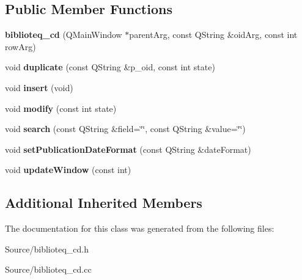 \subsection*{Public Member Functions}
\begin{DoxyCompactItemize}
\item 
{\bfseries biblioteq\+\_\+cd} (Q\+Main\+Window $\ast$parent\+Arg, const Q\+String \&oid\+Arg, const int row\+Arg)\hypertarget{classbiblioteq__cd_a060f54400243040c2374960a4f27bf40}{}\label{classbiblioteq__cd_a060f54400243040c2374960a4f27bf40}

\item 
void {\bfseries duplicate} (const Q\+String \&p\+\_\+oid, const int state)\hypertarget{classbiblioteq__cd_ae240accaf0c6d7d07effc54402b45f40}{}\label{classbiblioteq__cd_ae240accaf0c6d7d07effc54402b45f40}

\item 
void {\bfseries insert} (void)\hypertarget{classbiblioteq__cd_a29cb088f999555ed2d63b323b717b68f}{}\label{classbiblioteq__cd_a29cb088f999555ed2d63b323b717b68f}

\item 
void {\bfseries modify} (const int state)\hypertarget{classbiblioteq__cd_a0e2a26b8108bee92eb780a218fab7e7c}{}\label{classbiblioteq__cd_a0e2a26b8108bee92eb780a218fab7e7c}

\item 
void {\bfseries search} (const Q\+String \&field=\char`\"{}\char`\"{}, const Q\+String \&value=\char`\"{}\char`\"{})\hypertarget{classbiblioteq__cd_a0071b1a6d28b89c29b6ef94a9c701ae9}{}\label{classbiblioteq__cd_a0071b1a6d28b89c29b6ef94a9c701ae9}

\item 
void {\bfseries set\+Publication\+Date\+Format} (const Q\+String \&date\+Format)\hypertarget{classbiblioteq__cd_a080477c718d7c3fe6fdafc6915484df1}{}\label{classbiblioteq__cd_a080477c718d7c3fe6fdafc6915484df1}

\item 
void {\bfseries update\+Window} (const int)\hypertarget{classbiblioteq__cd_ae42d2fc452a5d3aebdfb162bf655cc3b}{}\label{classbiblioteq__cd_ae42d2fc452a5d3aebdfb162bf655cc3b}

\end{DoxyCompactItemize}
\subsection*{Additional Inherited Members}


The documentation for this class was generated from the following files\+:\begin{DoxyCompactItemize}
\item 
Source/biblioteq\+\_\+cd.\+h\item 
Source/biblioteq\+\_\+cd.\+cc\end{DoxyCompactItemize}
